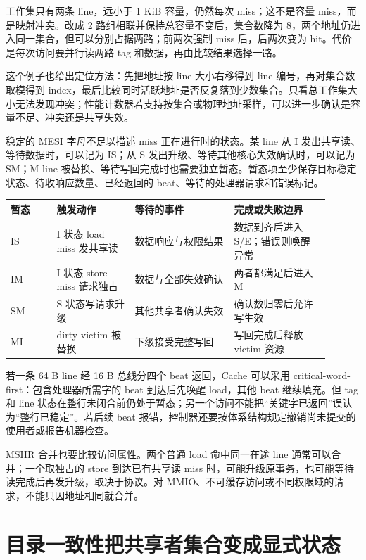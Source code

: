 工作集只有两条 line，远小于 1 KiB 容量，仍然每次 miss；这不是容量 miss，而是映射冲突。改成 2 路组相联并保持总容量不变后，集合数降为 8，两个地址仍进入同一集合，但可以分别占据两路；前两次强制 miss 后，后两次变为 hit。代价是每次访问要并行读两路 tag 和数据，再由比较结果选择一路。

这个例子也给出定位方法：先把地址按 line 大小右移得到 line 编号，再对集合数取模得到 index，最后比较同时活跃地址是否反复落到少数集合。只看总工作集大小无法发现冲突；性能计数器若支持按集合或物理地址采样，可以进一步确认是容量不足、冲突还是共享失效。


稳定的 MESI 字母不足以描述 miss 正在进行时的状态。某 line 从 I 发出共享读、等待数据时，可以记为 IS；从 S 发出升级、等待其他核心失效确认时，可以记为 SM；M line 被替换、等待写回完成时也需要独立暂态。暂态项至少保存目标稳定状态、待收响应数量、已经返回的 beat、等待的处理器请求和错误标记。

\begin{longtable}{L{0.13\linewidth}L{0.22\linewidth}L{0.28\linewidth}L{0.27\linewidth}}
\toprule
暂态 & 触发动作 & 等待的事件 & 完成或失败边界 \\
\midrule
IS & I 状态 load miss 发共享读 & 数据响应与权限结果 & 数据到齐后进入 S/E；错误则唤醒异常 \\
IM & I 状态 store miss 请求独占 & 数据与全部失效确认 & 两者都满足后进入 M \\
SM & S 状态写请求升级 & 其他共享者确认失效 & 确认数归零后允许写生效 \\
MI & dirty victim 被替换 & 下级接受完整写回 & 写回完成后释放 victim 资源 \\
\bottomrule
\end{longtable}

若一条 64 B line 经 16 B 总线分四个 beat 返回，Cache 可以采用 critical-word-first：包含处理器所需字的 beat 到达后先唤醒 load，其他 beat 继续填充。但 tag 和 line 状态在整行未闭合前仍处于暂态；另一个访问不能把“关键字已返回”误认为“整行已稳定”。若后续 beat 报错，控制器还要按体系结构规定撤销尚未提交的使用者或报告机器检查。

MSHR 合并也要比较访问属性。两个普通 load 命中同一在途 line 通常可以合并；一个取独占的 store 到达已有共享读 miss 时，可能升级原事务，也可能等待读完成后再发升级，取决于协议。对 MMIO、不可缓存访问或不同权限域的请求，不能只因地址相同就合并。

\section{目录一致性把共享者集合变成显式状态}

